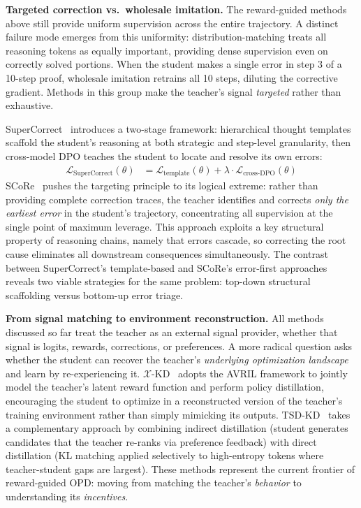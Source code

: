 \documentclass{article} %
\begin{document}
\textbf{Targeted correction vs.\ wholesale imitation.} The reward-guided methods above still provide uniform supervision across the entire trajectory. A distinct failure mode emerges from this uniformity: distribution-matching treats all reasoning tokens as equally important, providing dense supervision even on correctly solved portions. When the student makes a single error in step 3 of a 10-step proof, wholesale imitation retrains all 10 steps, diluting the corrective gradient. Methods in this group make the teacher's signal \emph{targeted} rather than exhaustive.

SuperCorrect~\citep{2410.09008} introduces a two-stage framework: hierarchical thought templates scaffold the student's reasoning at both strategic and step-level granularity, then cross-model DPO teaches the student to locate and resolve its own errors:
\begin{align}
\mathcal{L}_{\text{SuperCorrect}}(\theta) &= \mathcal{L}_{\text{template}}(\theta) + \lambda \cdot \mathcal{L}_{\text{cross-DPO}}(\theta)
\end{align}
SCoRe~\citep{2509.14257} pushes the targeting principle to its logical extreme: rather than providing complete correction traces, the teacher identifies and corrects \emph{only the earliest error} in the student's trajectory, concentrating all supervision at the single point of maximum leverage. This approach exploits a key structural property of reasoning chains, namely that errors cascade, so correcting the root cause eliminates all downstream consequences simultaneously. The contrast between SuperCorrect's template-based and SCoRe's error-first approaches reveals two viable strategies for the same problem: top-down structural scaffolding versus bottom-up error triage.

\textbf{From signal matching to environment reconstruction.} All methods discussed so far treat the teacher as an external signal provider, whether that signal is logits, rewards, corrections, or preferences. A more radical question asks whether the student can recover the teacher's \emph{underlying optimization landscape} and learn by re-experiencing it. $\mathcal{X}$-KD~\citep{2602.12674} adopts the AVRIL framework to jointly model the teacher's latent reward function and perform policy distillation, encouraging the student to optimize in a reconstructed version of the teacher's training environment rather than simply mimicking its outputs. TSD-KD~\citep{2603.13260} takes a complementary approach by combining indirect distillation (student generates candidates that the teacher re-ranks via preference feedback) with direct distillation (KL matching applied selectively to high-entropy tokens where teacher-student gaps are largest). These methods represent the current frontier of reward-guided OPD: moving from matching the teacher's \emph{behavior} to understanding its \emph{incentives}.
\end{document}
